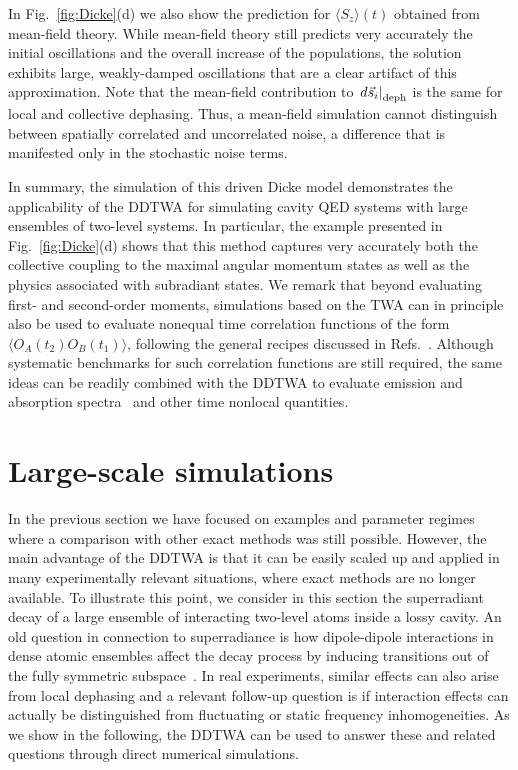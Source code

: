 \documentclass[pra,twocolumn,showpacs,preprintnumbers,amsmath,amssymb,superscriptaddress]{revtex4-1}
\begin{document}
In Fig.~\ref{fig:Dicke}(d) we also show the prediction for $\langle S_z\rangle(t)$ obtained from mean-field theory. While mean-field theory still predicts very accurately the initial oscillations and the overall increase of the populations, the solution exhibits large, weakly-damped oscillations that are a clear artifact of this approximation. Note that the mean-field contribution to $\left.d\vec s_i\right|_{\rm deph}$ is the same for local and collective dephasing.  Thus, a mean-field simulation cannot distinguish between spatially correlated and uncorrelated noise, a difference that is manifested only in the stochastic noise terms.   





In summary, the simulation of this driven Dicke model demonstrates the applicability of the DDTWA for simulating cavity QED systems with large ensembles of two-level systems. In particular, the example presented in Fig.~\ref{fig:Dicke}(d) shows that this method captures very accurately both the collective coupling to the maximal angular momentum states as well as the physics associated with subradiant states. We remark that beyond evaluating first- and second-order moments, simulations based on the TWA can in principle also be used to evaluate nonequal time correlation functions of the form $\langle O_A(t_2) O_B(t_1)\rangle$, following the general recipes discussed in Refs.~\cite{Polkovnikov2010,Berg2009,Wurtz2018,Deuar2021}. Although systematic benchmarks for such correlation functions are still required, the same ideas can be readily combined with the DDTWA to evaluate emission and absorption spectra~\cite{Liu2020,Jaeger2021} and other time nonlocal quantities.


\section{Large-scale simulations} \label{sec:largescale}
In the previous section we have focused on examples and parameter regimes where a comparison with other exact methods was still possible. However, the main advantage of the DDTWA is that it can be easily scaled up and applied in many experimentally relevant situations, where exact methods are no longer available. To illustrate this point, we consider in this section the superradiant decay of a large ensemble of interacting two-level atoms inside a lossy cavity.  An old question in connection to superradiance is how dipole-dipole interactions in dense atomic ensembles affect the decay process by inducing transitions out of the fully symmetric subspace~\cite{Gross1982}. In real experiments, similar effects can also arise from local dephasing and a relevant follow-up question is if interaction effects can actually be distinguished from fluctuating or static frequency inhomogeneities. As we show in the following, the DDTWA can be used to answer these and related  questions through direct numerical simulations.
\end{document}
